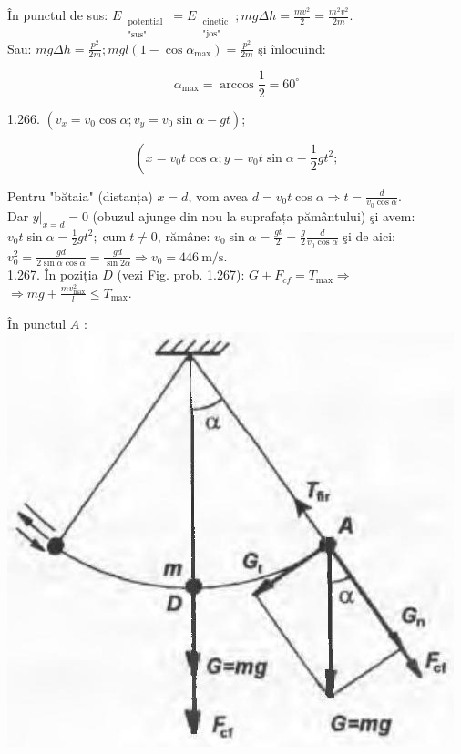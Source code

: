 \documentclass[10pt]{article}
\begin{document}
În punctul de sus: $E_{\substack{\text { potential } \\ \text { "sus" }}}=E_{\substack{\text { cinetic } \\ \text { "jos" }}} ; m g \Delta h=\frac{m v^{2}}{2}=\frac{m^{2} v^{2}}{2 m}$.\\
Sau: $m g \Delta h=\frac{p^{2}}{2 m} ; m g l\left(1-\cos \alpha_{\max }\right)=\frac{p^{2}}{2 m}$ şi înlocuind:

$$
\alpha_{\max }=\arccos \frac{1}{2}=60^{\circ}
$$

1.266. $\left(v_{x}=v_{0} \cos \alpha ; v_{y}=v_{0} \sin \alpha-g t\right)$;

$$
\left(x=v_{0} t \cos \alpha ; y=v_{0} t \sin \alpha-\frac{1}{2} g t^{2} ;\right.
$$

Pentru "bătaia" (distanța) $x=d$, vom avea $d=v_{0} t \cos \alpha \Rightarrow t=\frac{d}{v_{0} \cos \alpha}$.\\
Dar $\left.y\right|_{x=d}=0$ (obuzul ajunge din nou la suprafața pământului) şi avem:\\
$v_{0} t \sin \alpha=\frac{1}{2} g t^{2} ; \operatorname{cum} t \neq 0$, rămâne: $v_{0} \sin \alpha=\frac{g t}{2}=\frac{g}{2} \frac{d}{v_{0} \cos \alpha}$ şi de aici:\\
$v_{0}^{2}=\frac{g d}{2 \sin \alpha \cos \alpha}=\frac{g d}{\sin 2 \alpha} \Rightarrow v_{0}=446 \mathrm{~m} / \mathrm{s}$.\\
1.267. În poziția $D$ (vezi Fig. prob. 1.267): $G+F_{c f}=T_{\max } \Rightarrow$ $\Rightarrow m g+\frac{m v_{\max }^{2}}{l} \leq T_{\max }$.

În punctul $A$ :\\
\includegraphics[max width=\textwidth, center]{2025_07_01_5b3ff9fa0d508c8e9f17g-256}
\end{document}
